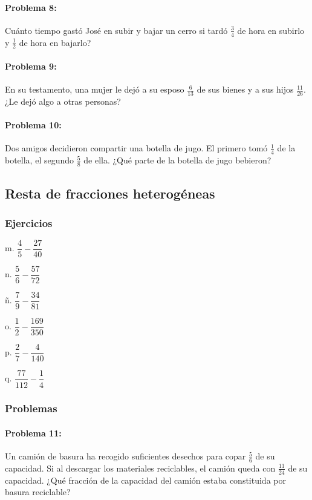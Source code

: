 \documentclass[10pt,twoside]{article}
\begin{document}
\paragraph*{Problema 8:} Cuánto tiempo gastó José en subir y bajar un cerro si tardó $\frac{3}{4}$ de hora en subirlo y $\frac{1}{2}$ de hora en bajarlo?
\paragraph*{Problema 9:} En su testamento, una mujer le dejó a su esposo $\frac{6}{13}$ de sus bienes y a sus hijos $\frac{11}{26}$. ¿Le dejó algo a otras personas?
\paragraph*{Problema 10:} Dos amigos decidieron compartir una botella de jugo. El primero tomó $\frac{1}{4}$ de la botella, el segundo $\frac{5}{8}$ de ella. ¿Qué parte de la botella de jugo bebieron?
\subsection*{Resta de fracciones heterog\'{e}neas}
\subsubsection*{Ejercicios}
\begin{enumerate}
\begin{multicols}{3}
\item[m.] $\dfrac{4}{5}-\dfrac{27}{40}$
\item[n.] $\dfrac{5}{6}-\dfrac{57}{72}$
\item[ñ.] $\dfrac{7}{9}-\dfrac{34}{81}$
\item[o.] $\dfrac{1}{2}-\dfrac{169}{350}$
\item[p.] $\dfrac{2}{7}-\dfrac{4}{140}$
\item[q.] $\dfrac{77}{112}-\dfrac{1}{4}$
\end{multicols}
\end{enumerate}
\subsubsection*{Problemas}
\paragraph*{Problema 11:} Un camión de basura ha recogido suficientes desechos para copar $\frac{5}{6}$ de su capacidad. Si al descargar los materiales reciclables, el camión queda con $\frac{11}{24}$ de su capacidad. ¿Qué fracción de la capacidad del camión estaba constituida por basura reciclable?
\end{document}
